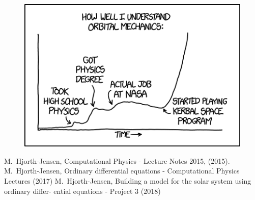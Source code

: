 \documentclass[10pt,showpacs,preprintnumbers,footinbib,amsmath,amssymb,aps,prl,twocolumn,groupedaddress,superscriptaddress,showkeys]{revtex4-1}
\begin{document}
\begin{figure}[h!]
  \center
  \includegraphics[scale=0.5]{figs/orbital_mechanics.png}
\end{figure}

\begin{thebibliography}{99}
 M.~Hjorth-Jensen, Computational Physics - Lecture Notes 2015, (2015).
 M.~Hjorth-Jensen, Ordinary differential equations - Computational Physics Lectures (2017)
 M.~Hjorth-Jensen, Building a model for the solar system using ordinary differ-
ential equations - Project 3 (2018)
\end{thebibliography}
\end{document}
